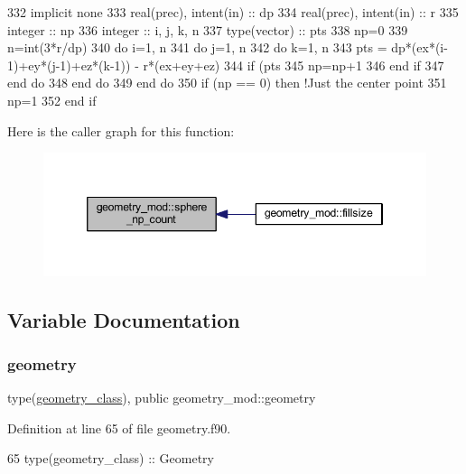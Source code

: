 \begin{DoxyCode}
332     \textcolor{keywordtype}{implicit none}
333     \textcolor{keywordtype}{real(prec)}, \textcolor{keywordtype}{intent(in)} :: dp
334     \textcolor{keywordtype}{real(prec)}, \textcolor{keywordtype}{intent(in)} :: r
335     \textcolor{keywordtype}{integer} :: np
336     \textcolor{keywordtype}{integer} :: i, j, k, n
337     \textcolor{keywordtype}{type}(vector) :: pts
338     np=0
339     n=int(3*r/dp)
340     \textcolor{keywordflow}{do} i=1, n
341         \textcolor{keywordflow}{do} j=1, n
342             \textcolor{keywordflow}{do} k=1, n
343                 pts = dp*(ex*(i-1)+ey*(j-1)+ez*(k-1)) - r*(ex+ey+ez)
344                 \textcolor{keywordflow}{if} (pts%
345                     np=np+1
346 \textcolor{keywordflow}{                end if}
347 \textcolor{keywordflow}{            end do}
348 \textcolor{keywordflow}{        end do}
349 \textcolor{keywordflow}{    end do}
350     \textcolor{keywordflow}{if} (np == 0) \textcolor{keywordflow}{then} \textcolor{comment}{!Just the center point}
351         np=1
352 \textcolor{keywordflow}{    end if}
\end{DoxyCode}
Here is the caller graph for this function\+:
\nopagebreak
\begin{figure}[H]
\begin{center}
\leavevmode
\includegraphics[width=346pt]{namespacegeometry__mod_a05de7940b4e7df5a2b31f3d0414e3743_icgraph}
\end{center}
\end{figure}


\subsection{Variable Documentation}
\mbox{\label{namespacegeometry__mod_ad2ad4f7e1138beaad5f37d5c15b7b457}} 
\subsubsection{\texorpdfstring{geometry}{geometry}}
{\footnotesize\ttfamily type(\mbox{\hyperlink{structgeometry__mod_1_1geometry__class}{geometry\+\_\+class}}), public geometry\+\_\+mod\+::geometry}



Definition at line 65 of file geometry.\+f90.


\begin{DoxyCode}
65     \textcolor{keywordtype}{type}(geometry\_class) :: Geometry
\end{DoxyCode}
